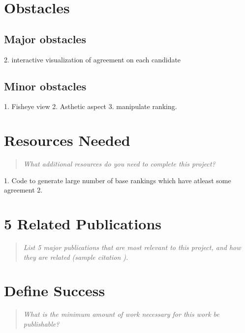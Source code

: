 \documentclass{proc}
\begin{document}
\section{Obstacles}

\subsection{Major obstacles} %
2. interactive visualization of agreement on each candidate

\subsection{Minor obstacles}
1. Fisheye view
2. Asthetic aspect
3. manipulate ranking.

\section{Resources Needed}
\begin{quote}
\textit{What additional resources do you need to complete this project?}
\end{quote}

1. Code to generate large number of base rankings which have atleast some agreement 
2. 

\section{5 Related Publications}
\begin{quote}
\textit{List 5 major publications that are most relevant to this project, and how they are related (sample citation \cite{wijk2005value}).}
\end{quote}

\section{Define Success}
\begin{quote}
\textit{What is the minimum amount of work necessary for this work be publishable?}
\end{quote}



\end{document}
